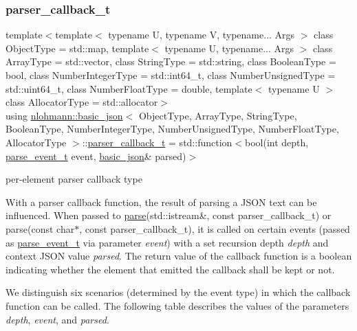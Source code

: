 \subsubsection{\texorpdfstring{parser\+\_\+callback\+\_\+t}{parser\_callback\_t}}
{\footnotesize\ttfamily template$<$template$<$ typename U, typename V, typename... Args $>$ class Object\+Type = std\+::map, template$<$ typename U, typename... Args $>$ class Array\+Type = std\+::vector, class String\+Type  = std\+::string, class Boolean\+Type  = bool, class Number\+Integer\+Type  = std\+::int64\+\_\+t, class Number\+Unsigned\+Type  = std\+::uint64\+\_\+t, class Number\+Float\+Type  = double, template$<$ typename U $>$ class Allocator\+Type = std\+::allocator$>$ \\
using \hyperlink{classnlohmann_1_1basic__json}{nlohmann\+::basic\+\_\+json}$<$ Object\+Type, Array\+Type, String\+Type, Boolean\+Type, Number\+Integer\+Type, Number\+Unsigned\+Type, Number\+Float\+Type, Allocator\+Type $>$\+::\hyperlink{classnlohmann_1_1basic__json_a9e35475e2027520a78e09f460dbe048a}{parser\+\_\+callback\+\_\+t} =  std\+::function$<$bool(int depth, \hyperlink{classnlohmann_1_1basic__json_aea1c863b719b4ca5b77188c171bbfafe}{parse\+\_\+event\+\_\+t} event, \hyperlink{classnlohmann_1_1basic__json}{basic\+\_\+json}\& parsed)$>$}



per-\/element parser callback type 

With a parser callback function, the result of parsing a J\+S\+ON text can be influenced. When passed to \hyperlink{classnlohmann_1_1basic__json_ace63ac4eb1dd7251a259d32e397461a3}{parse}(std\+::istream\&, const parser\+\_\+callback\+\_\+t) or parse(const char$\ast$, const parser\+\_\+callback\+\_\+t), it is called on certain events (passed as \hyperlink{classnlohmann_1_1basic__json_aea1c863b719b4ca5b77188c171bbfafe}{parse\+\_\+event\+\_\+t} via parameter {\itshape event}) with a set recursion depth {\itshape depth} and context J\+S\+ON value {\itshape parsed}. The return value of the callback function is a boolean indicating whether the element that emitted the callback shall be kept or not.

We distinguish six scenarios (determined by the event type) in which the callback function can be called. The following table describes the values of the parameters {\itshape depth}, {\itshape event}, and {\itshape parsed}.

